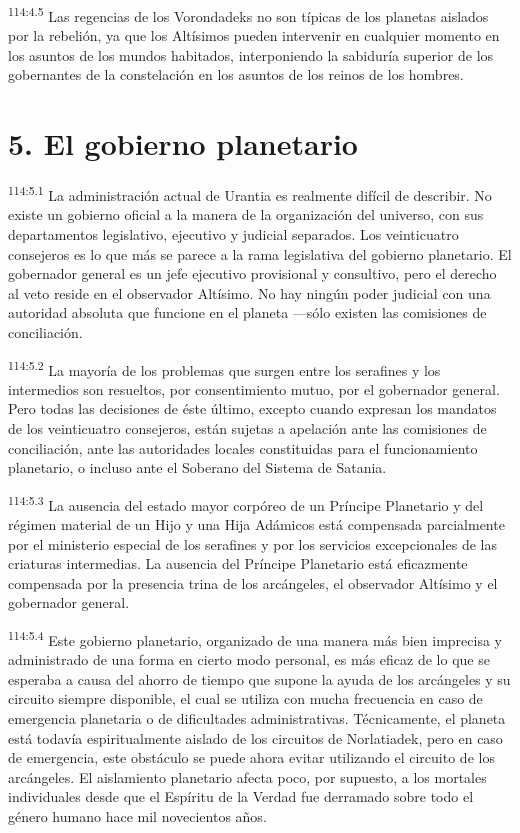 \documentclass[twoside, 11pt]{book}
\begin{document}
\par
\textsuperscript{114:4.5} Las regencias de los Vorondadeks no son típicas de los planetas aislados por la rebelión, ya que los Altísimos pueden intervenir en cualquier momento en los asuntos de los mundos habitados, interponiendo la sabiduría superior de los gobernantes de la constelación en los asuntos de los reinos de los hombres.

\section*{5. El gobierno planetario}
\par
\textsuperscript{114:5.1} La administración actual de Urantia es realmente difícil de describir. No existe un gobierno oficial a la manera de la organización del universo, con sus departamentos legislativo, ejecutivo y judicial separados. Los veinticuatro consejeros es lo que más se parece a la rama legislativa del gobierno planetario. El gobernador general es un jefe ejecutivo provisional y consultivo, pero el derecho al veto reside en el observador Altísimo. No hay ningún poder judicial con una autoridad absoluta que funcione en el planeta ---sólo existen las comisiones de conciliación.

\par
\textsuperscript{114:5.2} La mayoría de los problemas que surgen entre los serafines y los intermedios son resueltos, por consentimiento mutuo, por el gobernador general. Pero todas las decisiones de éste último, excepto cuando expresan los mandatos de los veinticuatro consejeros, están sujetas a apelación ante las comisiones de conciliación, ante las autoridades locales constituidas para el funcionamiento planetario, o incluso ante el Soberano del Sistema de Satania.

\par
\textsuperscript{114:5.3} La ausencia del estado mayor corpóreo de un Príncipe Planetario y del régimen material de un Hijo y una Hija Adámicos está compensada parcialmente por el ministerio especial de los serafines y por los servicios excepcionales de las criaturas intermedias. La ausencia del Príncipe Planetario está eficazmente compensada por la presencia trina de los arcángeles, el observador Altísimo y el gobernador general.

\par
\textsuperscript{114:5.4} Este gobierno planetario, organizado de una manera más bien imprecisa y administrado de una forma en cierto modo personal, es más eficaz de lo que se esperaba a causa del ahorro de tiempo que supone la ayuda de los arcángeles y su circuito siempre disponible, el cual se utiliza con mucha frecuencia en caso de emergencia planetaria o de dificultades administrativas. Técnicamente, el planeta está todavía espiritualmente aislado de los circuitos de Norlatiadek, pero en caso de emergencia, este obstáculo se puede ahora evitar utilizando el circuito de los arcángeles. El aislamiento planetario afecta poco, por supuesto, a los mortales individuales desde que el Espíritu de la Verdad fue derramado sobre todo el género humano hace mil novecientos años.
\end{document}
